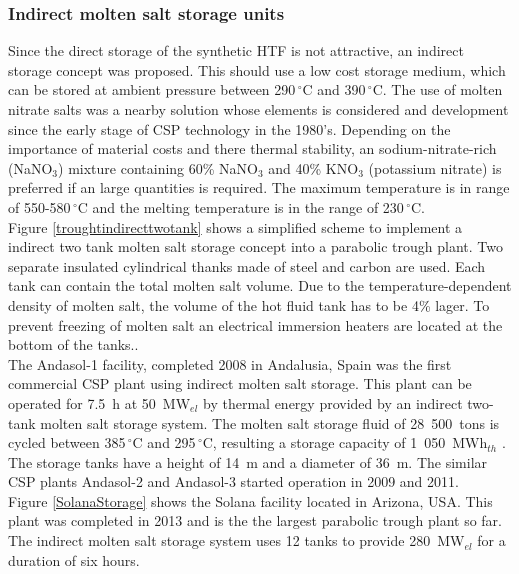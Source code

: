 \documentclass[Master,MEE,english]{twbook}%
\begin{document}
\subsubsection{Indirect molten salt storage units}
Since the direct storage of the synthetic HTF is not attractive, an indirect storage concept was proposed. This should use a low cost storage medium, which can be stored at ambient pressure between 290$\,^{\circ}\mathrm{C}$ and 390$\,^{\circ}\mathrm{C}$. The use of molten nitrate salts was a nearby solution whose elements is considered and development since the early stage of CSP technology in the 1980's. Depending on the importance of material costs and there thermal stability, an sodium-nitrate-rich (NaNO$_3$) mixture containing 60\% NaNO$_3$ and 40\% KNO$_3$ (potassium nitrate) is preferred if an large quantities is required. The maximum temperature is in range of 550-580$\,^{\circ}\mathrm{C}$ and the melting temperature is in the range of 230$\,^{\circ}\mathrm{C}$. \cite{Richter2013}\\
Figure \ref{troughtindirecttwotank} shows a simplified scheme to implement a indirect two tank molten salt storage concept into a parabolic trough plant. Two separate insulated cylindrical thanks made of steel and carbon are used. Each tank can contain the total molten salt volume. Due to the temperature-dependent density of molten salt, the volume of the hot fluid tank has to be 4\% lager. To prevent freezing of molten salt an electrical immersion heaters are located at the bottom of the tanks.\cite{Kelly2006}.\\
The Andasol-1 facility, completed 2008 in Andalusia, Spain was the first commercial CSP plant using indirect molten salt storage. This plant can be operated for 7.5~h at 50~MW$_{el}$ by thermal energy provided by an indirect two-tank molten salt storage system. The molten salt storage fluid of 28~500~tons is cycled between 385$\,^{\circ}\mathrm{C}$ and 295$\,^{\circ}\mathrm{C}$, resulting a storage capacity of 1~050~MWh$_{th}$ \cite{Relloso2009}. The storage tanks have a height of 14~m and a diameter of 36~m. The similar CSP plants Andasol-2 and Andasol-3 started operation in 2009 and 2011. \cite{SolarMillenniumAG2008,NREL2008,NREL2013a,NREL2013}\\
Figure \ref{SolanaStorage} shows the Solana facility located in Arizona, USA. This plant was completed in 2013 and is the the largest parabolic trough plant so far. The indirect molten salt storage system uses 12 tanks to provide 280~MW$_{el}$ for a duration of six hours. \cite{AbengoaSolar2013a}\\
\end{document}

